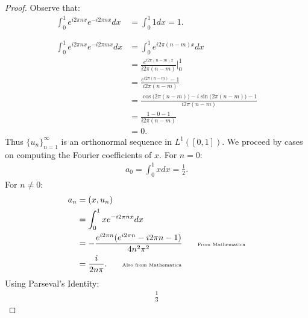     \begin{proof}
        Observe that:
            \begin{equation*}
            \begin{split}
                \int_{0}^{1} e^{i 2 \pi n x}e^{-i 2 \pi n x}dx 
                & = \int_{0}^{1} 1 dx = 1. \\
                &\phantom{a} \\
                \int_{0}^{1} e^{i 2 \pi n x}e^{-i 2 \pi m x}dx
                & = \int_{0}^{1} e^{i 2 \pi (n-m)x}dx \\
                & = \frac{e^{i 2 \pi (n-m)x}}{i 2 \pi (n-m)}\Bigg|_0^1 \\
                & = \frac{e^{i 2 \pi (n-m)} - 1}{i 2 \pi (n-m)} \\
                & = \frac{\cos\bigl(2\pi(n-m)\bigr) - i\sin\bigl(2 \pi (n-m)\bigr) - 1}{i 2 \pi (n-m)} \\
                & = \frac{1 - 0 - 1}{i 2 \pi (n-m)} \\
                & = 0.
            \end{split}
            \end{equation*}
        Thus $\{u_n\}_{n = 1}^\infty$ is an orthonormal sequence in $L^1([0,1])$. We proceed by cases on computing the Fourier coefficients of $x$. For $n = 0$:
            \begin{equation*}
            \begin{split}
                a_0 = \int_0^1 x dx = \frac{1}{2}.
            \end{split}
            \end{equation*}
        For $n \neq 0$:
            \begin{equation*}
            \begin{split}
                a_n 
                & = (x,u_n) \\
                & = \int_0^1 x e^{-i 2 \pi n x}dx \\
                & = -\frac{e^{i 2 \pi n}(e^{i 2 \pi n} - i 2 \pi n - 1)}{4 n^2 \pi ^2} \h9\h9\text{\tiny From Mathematica} \\
                & = \frac{i}{2n \pi}. \h9\h9\text{\tiny Also from Mathematica}
            \end{split}
            \end{equation*}
        Using Parseval's Identity:
            \begin{equation*}
            \begin{split}
                \frac{1}{3}

\end{split}
\end{equation*}
\end{proof}
